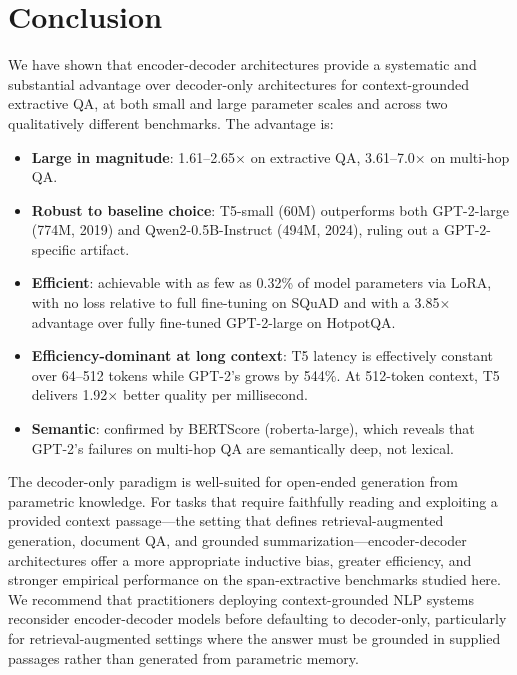 \documentclass[11pt]{article}
\newcommand{\gptlarge}{GPT-2-large\xspace}
\newcommand{\squad}{SQuAD\xspace}
\newcommand{\hotpotqa}{HotpotQA\xspace}
\begin{document}
\section{Conclusion}

We have shown that encoder-decoder architectures provide a systematic and
substantial advantage over decoder-only architectures for context-grounded
extractive QA, at both small and large parameter scales and across two qualitatively
different benchmarks.
The advantage is:

\begin{itemize}
  \item \textbf{Large in magnitude}: 1.61--2.65$\times$ on extractive QA,
        3.61--7.0$\times$ on multi-hop QA.
  \item \textbf{Robust to baseline choice}: T5-small (60M) outperforms both
        GPT-2-large (774M, 2019) and Qwen2-0.5B-Instruct (494M, 2024),
        ruling out a GPT-2-specific artifact.
  \item \textbf{Efficient}: achievable with as few as 0.32\% of model parameters
        via LoRA, with no loss relative to full fine-tuning on \squad and
        with a 3.85$\times$ advantage over fully fine-tuned \gptlarge on \hotpotqa.
  \item \textbf{Efficiency-dominant at long context}: T5 latency is effectively
        constant over 64--512 tokens while GPT-2's grows by 544\%.
        At 512-token context, T5 delivers 1.92$\times$ better quality per
        millisecond.
  \item \textbf{Semantic}: confirmed by BERTScore (roberta-large), which reveals
        that GPT-2's failures on multi-hop QA are semantically deep, not lexical.
\end{itemize}

The decoder-only paradigm is well-suited for open-ended generation from
parametric knowledge.
For tasks that require faithfully reading and exploiting a provided context
passage---the setting that defines retrieval-augmented generation, document QA,
and grounded summarization---encoder-decoder architectures offer a more
appropriate inductive bias, greater efficiency, and stronger empirical performance
on the span-extractive benchmarks studied here.
We recommend that practitioners deploying context-grounded NLP systems
reconsider encoder-decoder models before defaulting to decoder-only, particularly
for retrieval-augmented settings where the answer must be grounded in supplied
passages rather than generated from parametric memory.



\end{document}
